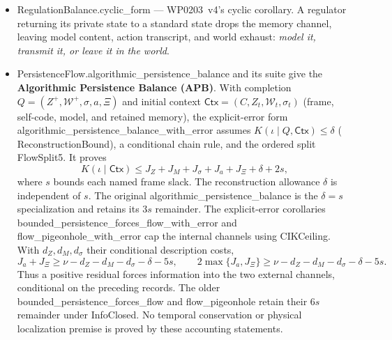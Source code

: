 \documentclass[11pt,a4paper]{article}
\newcommand{\lean}[1]{{\ttfamily\small
  \let\leanunderscore\_\def\_{\leanunderscore\allowbreak}#1}}
\begin{document}
\begin{itemize}[leftmargin=1.4em,itemsep=1pt]
\lean{no\_localized\_exhaust\_of\_world\_record\_insufficient} --- WP0203~v4's
\emph{localization} clause, which is what stops the balance closing by fiat. If the exhaust
were an arbitrary string the choice $\Xi:=y$ would satisfy recovery trivially; v4 requires
$\Xi$ to be a fixed projection of the realized world-side record $S$. At frame level that
shadow is \lean{Localized} ($K(\Xi\mid S)\le\mathrm{slack}$), and what is machine-checked is
the anti-vacuity content: a localized exhaust cannot manufacture recovery the world record
does not already support, so if $S$ with the visible episode fails to determine $y$, no
localized $\Xi$ closes the accounting. The physical-state structure --- what a world-side
record \emph{is}, and that the projection is fixed independently of $y$ --- is not
expressible in an \lean{AITFrame} and is not formalized.
\item \lean{RegulationBalance.cyclic\_form} --- WP0203~v4's cyclic corollary. A regulator
returning its private state to a standard state drops the memory channel, leaving model
content, action transcript, and world exhaust: \emph{model it, transmit it, or leave it in
the world}.
\item \lean{PersistenceFlow.algorithmic\_persistence\_balance} and its suite give the
\textbf{Algorithmic Persistence Balance (APB)}. With completion
$Q=(Z^+,\mathcal W^+,\sigma,a,\Xi)$ and initial context
$\mathsf{Ctx}=(C,Z_t,\mathcal W_t,\sigma_t)$ (frame, self-code, model, and retained memory), the explicit-error form
\lean{algorithmic\_persistence\_balance\_with\_error} assumes
$K(\iota\mid Q,\mathsf{Ctx})\le\delta$ (\lean{ReconstructionBound}), a conditional
chain rule, and the ordered split \lean{FlowSplit5}. It proves
\[
 K(\iota\mid\mathsf{Ctx})\le J_Z+J_M+J_\sigma+J_a+J_\Xi+\delta+2s,
\]
where $s$ bounds each named frame slack. The reconstruction allowance $\delta$
is independent of $s$. The original \lean{algorithmic\_persistence\_balance}
is the $\delta=s$ specialization and retains its $3s$ remainder.
The explicit-error corollaries
\lean{bounded\_persistence\_forces\_flow\_with\_error} and
\lean{flow\_pigeonhole\_with\_error} cap the internal channels using
\lean{CIKCeiling}. With $d_Z,d_M,d_\sigma$ their conditional description costs,
\[
 J_a+J_\Xi\ge\nu-d_Z-d_M-d_\sigma-\delta-5s,
 \qquad
 2\max\{J_a,J_\Xi\}\ge\nu-d_Z-d_M-d_\sigma-\delta-5s.
\]
Thus a positive residual forces information into the two external channels,
conditional on the preceding records. The older
\lean{bounded\_persistence\_forces\_flow} and \lean{flow\_pigeonhole} retain their
$6s$ remainder under \lean{InfoClosed}. No temporal conservation or physical
localization premise is proved by these accounting statements.


\end{itemize}
\end{document}
